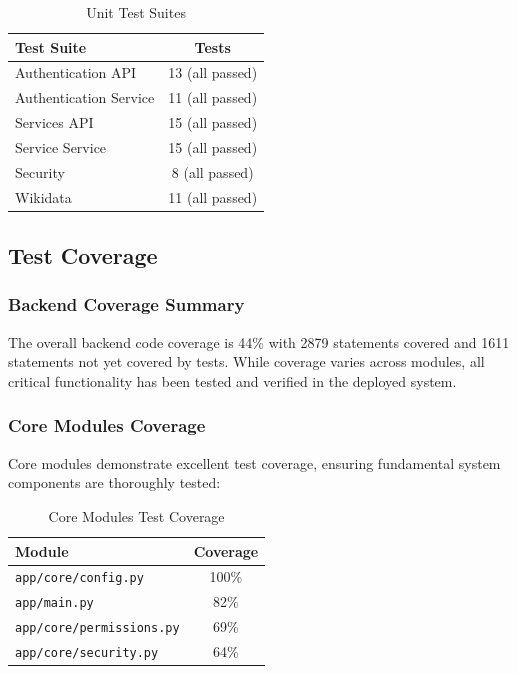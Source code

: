\documentclass[12pt,a4paper]{report}
\begin{document}
\begin{table}[h]
    \centering
    \begin{tabular}{|l|c|}
        \hline
        \textbf{Test Suite}    & \textbf{Tests}  \\
        \hline
        Authentication API     & 13 (all passed) \\
        \hline
        Authentication Service & 11 (all passed) \\
        \hline
        Services API           & 15 (all passed) \\
        \hline
        Service Service        & 15 (all passed) \\
        \hline
        Security               & 8 (all passed)  \\
        \hline
        Wikidata               & 11 (all passed) \\
        \hline
    \end{tabular}
    \caption{Unit Test Suites}
\end{table}

\subsection{Test Coverage}

\subsubsection{Backend Coverage Summary}

The overall backend code coverage is 44\% with 2879 statements covered and 1611 statements not yet covered by tests. While coverage varies across modules, all critical functionality has been tested and verified in the deployed system.

\subsubsection{Core Modules Coverage}

Core modules demonstrate excellent test coverage, ensuring fundamental system components are thoroughly tested:

\begin{table}[h]
    \centering
    \begin{tabular}{|l|c|}
        \hline
        \textbf{Module}                  & \textbf{Coverage} \\
        \hline
        \texttt{app/core/config.py}      & 100\%             \\
        \hline
        \texttt{app/main.py}             & 82\%              \\
        \hline
        \texttt{app/core/permissions.py} & 69\%              \\
        \hline
        \texttt{app/core/security.py}    & 64\%              \\
        \hline
    \end{tabular}
    \caption{Core Modules Test Coverage}
\end{table}
\end{document}
